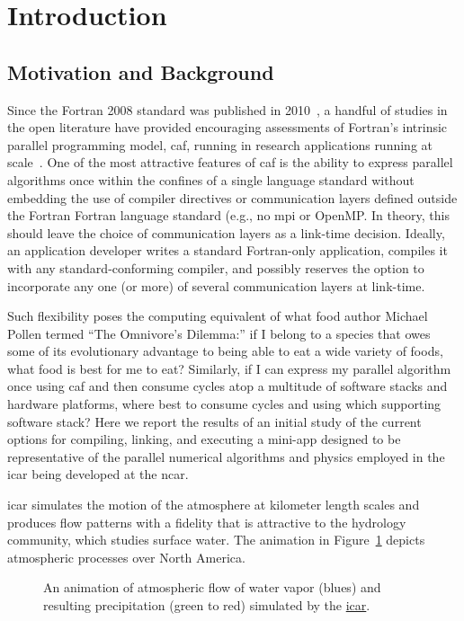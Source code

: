 \section{Introduction}
\subsection{Motivation and Background}
Since the Fortran 2008 standard was published in 2010~\cite{iso2010fortran}, a handful of studies in the open literature
have provided encouraging assessments of Fortran's intrinsic parallel programming model, \gls{caf}, running in research
applications running at scale~\cite{preissl2011multithreaded,garain2015comparing,mozdzynski2015partitioned}.   One of the
most attractive features of \gls{caf} is the ability to express parallel algorithms once within the confines of a single
language standard without embedding the use of compiler directives or communication layers defined outside the Fortran
Fortran language standard (e.g., no \gls{mpi} or OpenMP.  In theory, this should leave the choice of communication layers
as a link-time decision.  Ideally, an application developer writes a standard Fortran-only application, compiles it with any
standard-conforming compiler, and possibly reserves the option to incorporate any one (or more) of several communication layers
at link-time.

Such flexibility poses the computing equivalent of what food author Michael Pollen termed ``The Omnivore's Dilemma:'' if I
belong to a species that owes some of its evolutionary advantage to being able to eat a wide variety of foods, what food is
best for me to eat?  Similarly, if I can express my parallel algorithm once using \gls{caf} and then consume cycles atop a
multitude of software stacks and hardware platforms, where best to consume cycles and using which supporting software stack?
Here we report the results of an initial study of the current options for compiling, linking, and executing a \gls{mini-app}
designed to be representative of the parallel numerical algorithms and physics employed in the \gls{icar} being developed at
the \gls{ncar}.

\gls{icar} simulates the motion of the atmosphere at kilometer length scales and produces flow patterns with a fidelity that is
attractive to the hydrology community, which studies surface water.  The animation in Figure~\ref{figure:icar} depicts atmospheric processes over North America.

\begin{figure}
   \vspace{-18pt}
   \vbox{\hspace{-24pt}
   }
   \caption{An animation of atmospheric flow of water vapor (blues) and resulting precipitation (green to red) simulated by the \href{https://github.com/gutmann/icar}{\gls{icar}}.
\label{figure:icar}}
\end{figure}

